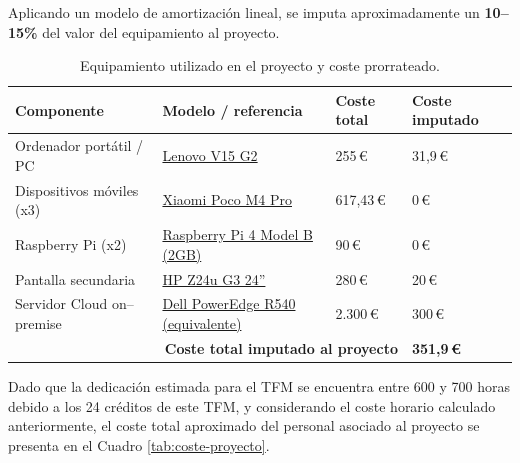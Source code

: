 \documentclass{report}
\begin{document}
Aplicando un modelo de amortización lineal, se imputa aproximadamente un \textbf{10–15\%} del valor del equipamiento al proyecto.



\begin{table}[H]
\centering
\footnotesize
\caption{Equipamiento utilizado en el proyecto y coste prorrateado.}
\label{tab:equipamiento_prorrateado}

\renewcommand{\arraystretch}{1.15}
\setlength{\tabcolsep}{4pt}

\begin{tabular}{|p{3.2cm}|p{4.8cm}|p{2.4cm}|p{2.6cm}|}
\hline
\textbf{Componente} &
\textbf{Modelo / referencia} &
\textbf{Coste total} &
\textbf{Coste imputado} \\
\hline

Ordenador portátil / PC &
\href{https://www.pccomponentes.com/lenovo-v15-g2-itl-intel-core-i3-1115g4-8gb-256gb-ssd-156}{Lenovo V15 G2} &
255\,€ &
31{,}9\,€ \\
\hline

Dispositivos móviles (x3) &
\href{https://eurofertas.eu/products/smartphone-pocophone-xiaomi-poco-m4-pro-6-6-octa-core-4-gb-ram-64-gb-azul}{Xiaomi Poco M4 Pro} &
617{,}43\,€ &
0\,€ \\
\hline

Raspberry Pi (x2) &
\href{https://store.rokland.com/products/raspberry-pi-4-model-b-2gb-no-quantity-restrictions}{Raspberry Pi 4 Model B (2GB)} &
90\,€ &
0\,€ \\
\hline

Pantalla secundaria &
\href{https://www.monitors.com/products/hp-z24u-1c4z6aa}{HP Z24u G3 24''} &
280\,€ &
20\,€ \\
\hline

Servidor Cloud on--premise &
\href{https://www.pccomponentes.com/dell-poweredge-r540-xeon-silver-4210-16gb}{Dell PowerEdge R540 (equivalente)} &
2.300\,€ &
300\,€ \\
\hline

\multicolumn{3}{|r|}{\textbf{Coste total imputado al proyecto}} &
\textbf{351{,}9\,€} \\
\hline

\end{tabular}
\end{table}


Dado que la dedicación estimada para el TFM se encuentra entre 600 y 700 horas \cite{UGR_ECTS} debido a los 24 créditos de este TFM, y considerando el coste horario calculado anteriormente, el coste total aproximado del personal asociado al proyecto se presenta en el Cuadro \ref{tab:coste-proyecto}.  
\end{document}
